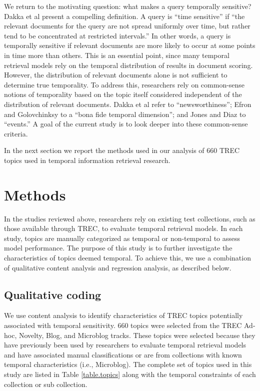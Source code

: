 \documentclass[runningheads,a4paper]{llncs}
\begin{document}
We return to the motivating question: what makes a query temporally sensitive? Dakka et al \cite{Dakka2012} present a compelling definition. A query is ``time sensitive''  if  ``the relevant documents for the query are not spread uniformly over time, but rather tend to be concentrated at restricted intervals.''  In other words, a query is temporally sensitive if relevant documents are more likely to occur at some points in time more than others. This is an essential point, since many temporal retrieval models rely on the temporal distribution of results in document scoring. However, the distribution of relevant documents alone is not sufficient to determine true temporality. To address this, researchers rely on common-sense notions of temporality based on the topic itself considered independent of the distribution of relevant documents. Dakka et al refer to ``newsworthiness''; Efron and Golovchinksy to a ``bona fide temporal dimension''; and Jones and Diaz to ``events.''  A goal of the current study is to look deeper into these common-sense criteria.

In the next section we report the methods used in our analysis of  660 TREC topics used in temporal information retrieval research. 

\section{Methods}

In the studies reviewed above, researchers rely on existing test collections, such as those available through TREC, to evaluate temporal retrieval models. In each study, topics are manually categorized as temporal or non-temporal to assess model performance. The purpose of this study is to further investigate the characteristics of topics deemed temporal. To achieve this, we use a combination of qualitative content analysis and regression analysis, as described below.

\subsection{Qualitative coding}
We use content analysis \cite{Krippendorf1980} to identify characteristics of TREC topics potentially associated with temporal sensitivity. 660 topics were selected from the TREC Ad-hoc, Novelty, Blog, and Microblog tracks. These topics were selected because they have previously been used by researchers to evaluate temporal retrieval models and have associated manual classifications or are from collections with known temporal characteristics (i.e., Microblog). The complete set of topics used in this study are listed in Table \ref{table.topics} along with the temporal constraints of each collection or sub collection.
\end{document}
